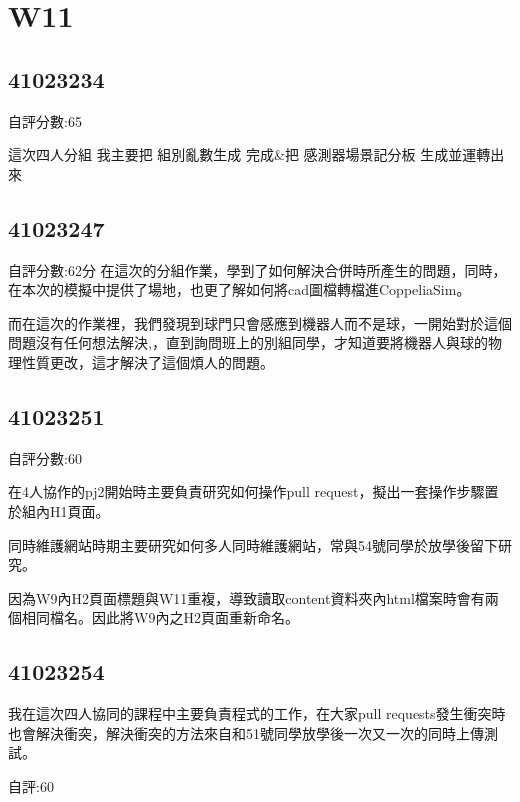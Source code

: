 \chapter{W11}


\section{41023234}
自評分數:65

這次四人分組 我主要把  \(組別亂數生成\)  完成&把  \(感測器\)\(場景\)\(記分板\)  生成並運轉出來


\section{41023247}
自評分數:62分
在這次的分組作業，學到了如何解決合併時所產生的問題，同時，在本次的模擬中提供了場地，也更了解如何將cad圖檔轉檔進CoppeliaSim。

而在這次的作業裡，我們發現到球門只會感應到機器人而不是球，一開始對於這個問題沒有任何想法解決,，直到詢問班上的別組同學，才知道要將機器人與球的物理性質更改，這才解決了這個煩人的問題。
\section{41023251}

自評分數:60

在4人協作的pj2開始時主要負責研究如何操作pull request，擬出一套操作步驟置於組內H1頁面。

同時維護網站時期主要研究如何多人同時維護網站，常與54號同學於放學後留下研究。

因為W9內H2頁面標題與W11重複，導致讀取content資料夾內html檔案時會有兩個相同檔名。因此將W9內之H2頁面重新命名。


\section{41023254}

我在這次四人協同的課程中主要負責程式的工作，在大家pull requests發生衝突時也會解決衝突，解決衝突的方法來自和51號同學放學後一次又一次的同時上傳測試。

自評:60
